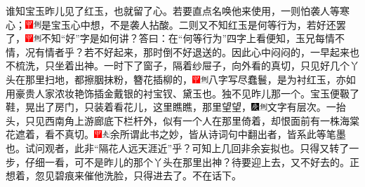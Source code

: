 谁知宝玉昨儿见了红玉，也就留了心。若要直点名唤他来使用，一则怕袭人等寒心；{\includegraphics[width=3mm]{../Images/00002}\includegraphics[width=3mm]{../Images/00011}\footnotesize \kaishu 是宝玉心中想，不是袭人拈酸。}二则又不知红玉是何等行为，若好还罢了，{\includegraphics[width=3mm]{../Images/00002}\includegraphics[width=3mm]{../Images/00011}\footnotesize \kaishu 不知“好”字是如何讲？答曰：在“何等行为”四字上看便知，玉兄每情不情，况有情者乎？}若不好起来，那时倒不好退送的。因此心中闷闷的，一早起来也不梳洗，只坐着出神。一时下了窗子，隔着纱屉子，向外看的真切，只见好几个丫头在那里扫地，都擦胭抹粉，簪花插柳的，{\includegraphics[width=3mm]{../Images/00002}\includegraphics[width=3mm]{../Images/00011}\footnotesize \kaishu 八字写尽蠢鬟，是为衬红玉，亦如用豪贵人家浓妆艳饰插金戴银的衬宝钗、黛玉也。}独不见昨儿那一个。宝玉便靸了鞋，晃出了房门，只装着看花儿，这里瞧瞧，那里望望，{\includegraphics[width=3mm]{../Images/00004}\includegraphics[width=3mm]{../Images/00011}\footnotesize \kaishu 文字有层次。}一抬头，只见西南角上游廊底下栏杆外，似有一个人在那里倚着，却恨面前有一株海棠花遮着，看不真切。{\includegraphics[width=3mm]{../Images/00002}\includegraphics[width=3mm]{../Images/00012}\footnotesize \kaishu 余所谓此书之妙，皆从诗词句中翻出者，皆系此等笔墨也。试问观者，此非“隔花人远天涯近”乎？可知上几回非余妄拟也。}只得又转了一步，仔细一看，可不是昨儿的那个丫头在那里出神？待要迎上去，又不好去的。正想着，忽见碧痕来催他洗脸，只得进去了。不在话下。

